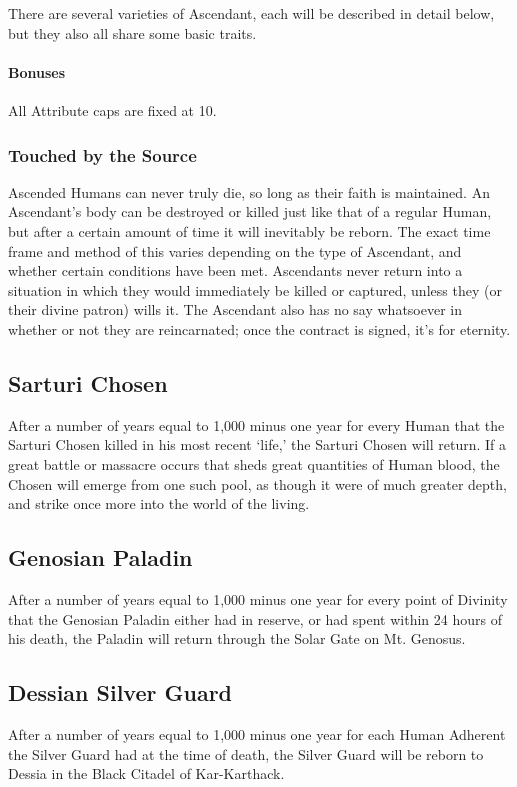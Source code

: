 \documentclass[oneside,11pt,english]{book}
\begin{document}
There are several varieties of Ascendant, each will be described in detail below, but they also all share some basic traits. 


\paragraph{Bonuses}
All Attribute caps are fixed at 10.
\subsubsection{Touched by the Source}
Ascended Humans can never truly die, so long as their faith is maintained. An Ascendant's body can be 
destroyed or killed just like that of a regular Human, but after a certain amount of time it will inevitably 
be reborn. The exact time frame and method of this varies depending on the type of Ascendant, and 
whether certain conditions have been met. Ascendants never return into a situation in which they would 
immediately be killed or captured, unless they (or their divine patron) wills it. The Ascendant also has no 
say whatsoever in whether or not they are reincarnated; once the contract is signed, it's for eternity. 
 

\subsection*{Sarturi Chosen}
After a number of years equal to 1,000 minus one year for every Human that the Sarturi Chosen killed in 
his most recent ‘life,’ the Sarturi Chosen will return. If a great battle or massacre occurs that sheds great 
quantities of Human blood, the Chosen will emerge from one such pool, as though it were of much 
greater depth, and strike once more into the world of the living. 
\subsection*{Genosian Paladin}
After a number of years equal to 1,000 minus one year for every point of Divinity that the Genosian 
Paladin either had in reserve, or had spent within 24 hours of his death, the Paladin will return through the 
Solar Gate on Mt. Genosus. 
\subsection*{Dessian Silver Guard}
After a number of years equal to 1,000 minus one year for each Human Adherent the Silver Guard had at 
the time of death, the Silver Guard will be reborn to Dessia in the Black Citadel of Kar-Karthack. 
 
\end{document}
